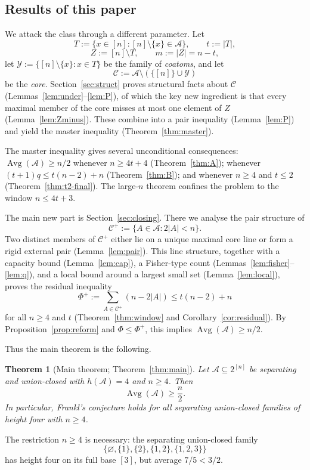 \documentclass[11pt,a4paper]{amsart}
\theoremstyle{plain}
\newtheorem{theorem}{Theorem}[section]
\theoremstyle{definition}
\newcommand{\A}{\mathcal{A}}
\newcommand{\Cc}{\mathcal{C}}
\newcommand{\Yy}{\mathcal{Y}}
\newcommand{\Avg}{\operatorname{Avg}}
\newcommand{\Cp}{\Cc^{+}}
\begin{document}
\subsection*{Results of this paper}

We attack the class through a different parameter. Let
\[
  T:=\{x\in[n]:[n]\setminus\{x\}\in\A\},\qquad t:=|T|,
\]
\[
  Z:=[n]\setminus T,\qquad m:=|Z|=n-t,
\]
let $\Yy:=\{[n]\setminus\{x\}:x\in T\}$ be the family of \emph{coatoms}, and let
\[
  \Cc:=\A\setminus(\{[n]\}\cup\Yy)
\]
be the \emph{core}. Section~\ref{sec:struct} proves structural facts about $\Cc$
(Lemmas~\ref{lem:under}--\ref{lem:P}), of which the key new ingredient is that
every maximal member of the core misses at most one element of $Z$
(Lemma~\ref{lem:Zminus}). These combine into a pair inequality
(Lemma~\ref{lem:P}) and yield the master inequality
(Theorem~\ref{thm:master}).

The master inequality gives several unconditional consequences:
$\Avg(\A)\ge n/2$ whenever $n\ge4t+4$ (Theorem~\ref{thm:A}); whenever
$(t+1)q\le t(n-2)+n$ (Theorem~\ref{thm:B}); and whenever $n\ge4$ and $t\le2$
(Theorem~\ref{thm:t2-final}). The large-$n$ theorem confines the problem to the
window $n\le4t+3$.

The main new part is Section~\ref{sec:closing}. There we analyse the pair
structure of
\[
  \Cp:=\{A\in\A:2|A|<n\}.
\]
Two distinct members of $\Cp$ either lie on a unique maximal core line or form a
rigid external pair (Lemma~\ref{lem:pair}). This line structure, together with a
capacity bound (Lemma~\ref{lem:cap}), a Fisher-type count
(Lemmas~\ref{lem:fisher}--\ref{lem:q}), and a local bound around a largest small
set (Lemma~\ref{lem:local}), proves the residual inequality
\[
  \Phi^+:=\sum_{A\in\Cp}(n-2|A|)\le t(n-2)+n
\]
for all $n\ge4$ and $t$ (Theorem~\ref{thm:window} and Corollary~\ref{cor:residual}). By
Proposition~\ref{prop:reform} and $\Phi\le\Phi^+$, this implies
$\Avg(\A)\ge n/2$.

Thus the main theorem is the following.

\begin{theorem}[Main theorem; Theorem~\ref{thm:main}]
Let $\A\subseteq2^{[n]}$ be separating and union-closed with $h(\A)=4$ and $n\ge4$. Then
\[
  \Avg(\A)\ge\frac n2.
\]
In particular, Frankl's conjecture holds for all separating union-closed families
of height four with $n\ge4$.
\end{theorem}

The restriction $n\ge4$ is necessary: the separating union-closed family
\[
 \{\varnothing,\{1\},\{2\},\{1,2\},\{1,2,3\}\}
\]
has height four on its full base $[3]$, but average $7/5<3/2$.
\end{document}
